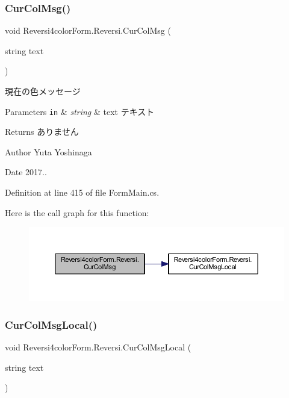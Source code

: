 \subsubsection{\texorpdfstring{Cur\+Col\+Msg()}{CurColMsg()}}
{\footnotesize\ttfamily void Reversi4color\+Form.\+Reversi.\+Cur\+Col\+Msg (\begin{DoxyParamCaption}\item[{string}]{text }\end{DoxyParamCaption})}



現在の色メッセージ 


\begin{DoxyParams}[1]{Parameters}
\mbox{\tt in}  & {\em string} & text テキスト \\
\hline
\end{DoxyParams}
\begin{DoxyReturn}{Returns}
ありません 
\end{DoxyReturn}
\begin{DoxyAuthor}{Author}
Yuta Yoshinaga 
\end{DoxyAuthor}
\begin{DoxyDate}{Date}
2017.. 
\end{DoxyDate}


Definition at line 415 of file Form\+Main.\+cs.

Here is the call graph for this function\+:
\nopagebreak
\begin{figure}[H]
\begin{center}
\leavevmode
\includegraphics[width=350pt]{class_reversi4color_form_1_1_reversi_acb7220a84f599ebf736216cc055b2ae3_cgraph}
\end{center}
\end{figure}
\mbox{\label{class_reversi4color_form_1_1_reversi_a6ab2074a5474736e76644cf45c08827b}} 
\subsubsection{\texorpdfstring{Cur\+Col\+Msg\+Local()}{CurColMsgLocal()}}
{\footnotesize\ttfamily void Reversi4color\+Form.\+Reversi.\+Cur\+Col\+Msg\+Local (\begin{DoxyParamCaption}\item[{string}]{text }\end{DoxyParamCaption})}



